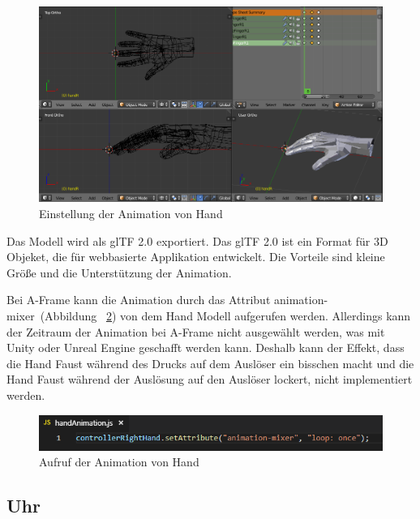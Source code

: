 \begin{figure}[ht]
\vspace*{0.2cm}
\centering
\includegraphics[width=\textwidth]{images/handKeyframes.png}
\caption[Einstellung der Animation von Hand]{Einstellung der Animation von Hand}
\label{fig:handKeyframes} 
\end{figure}
 
 Das Modell wird als glTF 2.0 exportiert. Das glTF 2.0 ist ein Format für 3D Objeket, die für webbasierte Applikation entwickelt. Die Vorteile sind kleine Größe und die Unterstützung der Animation.
 
 Bei A-Frame kann die Animation durch das Attribut \glqq animation-mixer\grqq\ (Abbildung ~\ref{fig:handAnimation}) von dem Hand Modell aufgerufen werden. Allerdings kann der Zeitraum der Animation bei A-Frame nicht ausgewählt werden, was mit Unity oder Unreal Engine geschafft werden kann. Deshalb kann der Effekt, dass die Hand Faust während des Drucks auf dem Auslöser ein bisschen macht und die Hand Faust während der Auslösung auf den Auslöser lockert, nicht implementiert werden.
 
\begin{figure}[ht]
\vspace*{0.2cm}
\centering
\includegraphics[width=\textwidth]{images/handAnimation.png}
\caption[Aufruf der Animation von Hand]{Aufruf der Animation von Hand}
\label{fig:handAnimation} 
\end{figure}
 
 \subsection{Uhr}
 
